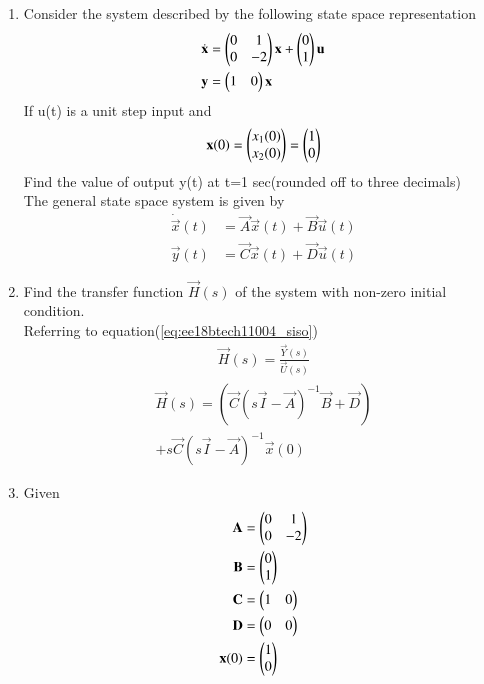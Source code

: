\begin{enumerate}[label=\thesubsection.\arabic*.,ref=\thesubsection.\theenumi]

\item
Consider the system described by the following state space representation  
\begin{align}
\dot{\mathbf{ x}}&=\begin{pmatrix}0&1\\0&-2\end{pmatrix}\mathbf{x} + \begin{pmatrix}0\\1\end{pmatrix}\mathbf{u}\\  
\mathbf{y} &= \begin{pmatrix}1&0\end{pmatrix}\mathbf{x}
\end{align}
If u(t) is a unit step input and 
\begin{align}
\mathbf{x}(0)=\begin{pmatrix}x_{1}(0)\\x_{2}(0)\end{pmatrix}=\begin{pmatrix}1\\0\end{pmatrix}
\end{align}
Find the value of output y(t) at t=1 sec(rounded off to three decimals)
\\
\solution The general state space system is given by
\begin{align}
\dot{\vec{x}}(t)&=\vec{A}\vec{x}(t)+\vec{B}\vec{u}(t) \label{eq:num_1}\\
 \vec{y}(t)&=\vec{C}\vec{x}(t)+\vec{D} \vec{u}(t) \label{eq:num_2}
\end{align}
\item Find the transfer function $\vec{H}(s)$ of the system with non-zero initial condition.
\\
\solution Referring to equation(\ref{eq:ee18btech11004_siso})
\begin{align}
\vec{H}(s) = \frac{\vec{Y}(s)}{\vec{U}(s)}
\end{align}
\begin{multline}
\vec{H}(s)=( \vec{C}{(s\vec{I}-\vec{A})^{-1}}\vec{B}+\vec{D}) \label{eq:ee18btech11047_TF}
\\
+ s\vec{C}(s\vec{I}-\vec{A})^{-1}\vec{x}(0) \label{eq:num_4}
\end{multline}
\item Given
\begin{align}
\mathbf{A}&=\begin{pmatrix}0&1\\0&-2\end{pmatrix}\\
\mathbf{B}&=\begin{pmatrix}0\\1\end{pmatrix}\\
\mathbf{C}&=\begin{pmatrix}1&0\end{pmatrix}\\
\mathbf{D}&=\begin{pmatrix}0&0\end{pmatrix}\\
\mathbf{x}(0)&=\begin{pmatrix}1\\0\end{pmatrix}
\end{align}

\end{enumerate}
